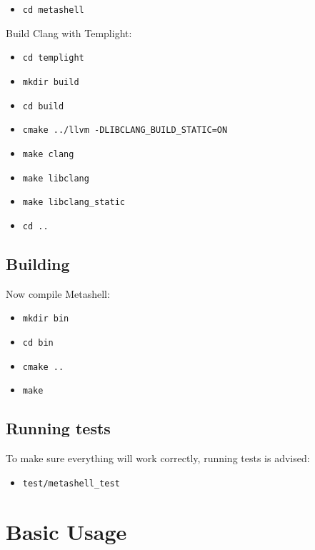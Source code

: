 \begin{itemize}
    \item \verb$cd metashell$
\end{itemize}

Build Clang with Templight\cite{templight}:

\begin{itemize}
    \item \verb$cd templight$
    \item \verb$mkdir build$
    \item \verb$cd build$
    \item \verb$cmake ../llvm -DLIBCLANG_BUILD_STATIC=ON$
    \item \verb$make clang$
    \item \verb$make libclang$
    \item \verb$make libclang_static$
    \item \verb$cd ..$
\end{itemize}

\subsection{Building}

Now compile Metashell:

\begin{itemize}
    \item \verb$mkdir bin$
    \item \verb$cd bin$
    \item \verb$cmake ..$
    \item \verb$make$
\end{itemize}


\subsection{Running tests}

To make sure everything will work correctly, running tests is advised:

\begin{itemize}
    \item \verb$test/metashell_test$
\end{itemize}

\section{Basic Usage}


